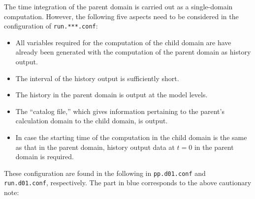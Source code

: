 The time integration of the parent domain is carried out as a single-domain computation. However, the following five aspects need to be considered in the configuration of \verb|run.***.conf|:
\begin{itemize}
 \item All variables required for the computation of the child domain are have already been generated with the computation of the parent domain as history output.
 \item The interval of the history output is sufficiently short.
 \item The history in the parent domain is output at the model levels.
 \item The ``catalog file,'' which gives information pertaining to the parent’s calculation domain
   to the child domain, is output.
 \item In case the starting time of the computation in the child domain is the same as that in the parent domain,
 history output data at $t=0$ in the parent domain is required.
\end{itemize}
These configuration are found in the following in \verb|pp.d01.conf| and \verb|run.d01.conf|, respectively. The part in blue corresponds to the above cautionary note:


